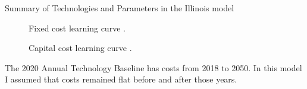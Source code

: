 \begin{table}[H]
  \centering
  \caption{Summary of Technologies and Parameters in the Illinois model}
  \label{tab:il-tech}
  \resizebox{\textwidth}{!}{
  
  } %
\end{table}


\begin{figure}[H]
  \begin{minipage}{0.48\textwidth}
    \captionsetup{type=figure}
    \centering
    \resizebox{\columnwidth}{!}{}
    \caption[]{Fixed cost learning curve \cite{nrel_2020_2020}.}
    \label{fig:fix_costs}
  \end{minipage}
  \begin{minipage}{0.48\textwidth}
    \captionsetup{type=figure}
    \centering
    \resizebox{\columnwidth}{!}{}
    \caption[]{Capital cost learning curve \cite{nrel_2020_2020}.}
    \label{fig:cap_costs}
  \end{minipage}
\end{figure}


The 2020 Annual Technology Baseline has costs from 2018 to 2050. In this model
I assumed that costs remained flat before and after those years.

